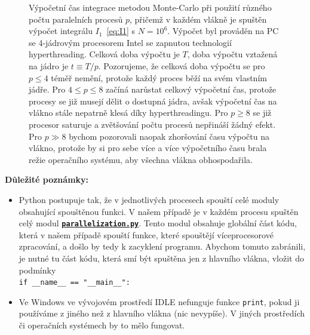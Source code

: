 \documentclass[a4paper,11pt,twoside]{article}
\def\code#1{\textnormal{\texttt{#1}}}
\def\ghfile#1#2{\textnormal{\textbf{\texttt{\href{https://github.com/PavelStransky/PCInPhysics2021/blob/main/#1#2}{#2}}}}}
\theoremstyle{red}
\theoremstyle{green}
\begin{document}
    \begin{figure}[!htb]
        \begin{subfigure}{0.49\linewidth}
            \centering{}
            \caption{}
        \end{subfigure}
        \hfill
        \begin{subfigure}{0.49\linewidth}
            \centering{}
            \caption{}
        \end{subfigure}
        \caption{
            \protect\small
            Výpočetní čas integrace metodou Monte-Carlo při použití různého počtu paralelních procesů $p$, přičemž v každém vlákně je spuštěn výpočet integrálu $I_{1}$~\eqref{eq:I1} s $N=10^{6}$.
            Výpočet byl prováděn na PC se 4-jádrovým procesorem Intel se zapnutou technologií hyperthreading.
            Celková doba výpočtu je $T$, doba výpočtu vztažená na jádro je $t\equiv T/p$.
            Pozorujeme, že celková doba výpočtu se pro $p\leq4$ téměř nemění, protože každý proces běží na svém vlastním jádře.
            Pro $4\leq p\leq8$ začíná narůstat celkový výpočetní čas, protože procesy se již musejí dělit o dostupná jádra, avšak výpočetní čas na vlákno stále nepatrně klesá díky hyperthreadingu.
            Pro $p\geq8$ se již procesor saturuje a zvětšování počtu procesů nepřináší žádný efekt.
            Pro $p\gg8$ bychom pozorovali naopak zhoršování času výpočtu na vlákno, protože by si pro sebe více a více výpočetního času brala režie operačního systému, aby všechna vlákna obhospodařila.
        }
        \label{fig:Duration}
    \end{figure}

    {\bf Důležité poznámky:}
    \begin{itemize}
        \item
            Python postupuje tak, že v jednotlivých procesech spouští celé moduly obsahující spouštěnou funkci.
            V našem případě je v každém procesu spuštěn celý modul \ghfile{python/montecarlo/}{parallelization.py}.
            Tento modul obsahuje globální část kódu, která v našem případě spouští funkce, které spouštějí víceprocesorové zpracování, a došlo by tedy k zacyklení programu.
            Abychom tomuto zabránili, je nutné tu část kódu, která smí být spuštěna jen z hlavního vlákna, vložit do podmínky\\
            \code{if \_\_name\_\_ == "\_\_main\_\_":}

        \item
            Ve Windows ve vývojovém prostředí IDLE nefunguje funkce \code{print}, pokud ji používáme z jiného než z hlavního vlákna (nic nevypíše).
            V jiných prostředích či operačních systémech by to mělo fungovat.
    \end{itemize}
\end{document}

